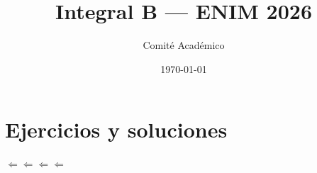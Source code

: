 \documentclass[11pt,letterpaper]{article}
\title{Integral B --- ENIM 2026}
\author{Comité Académico}
\date{\today}
\begin{document}
\maketitle
\tableofcontents
\newpage

\section{Ejercicios y soluciones}




$\Leftarrow \Leftarrow \Leftarrow \Leftarrow $ 
\end{document}
